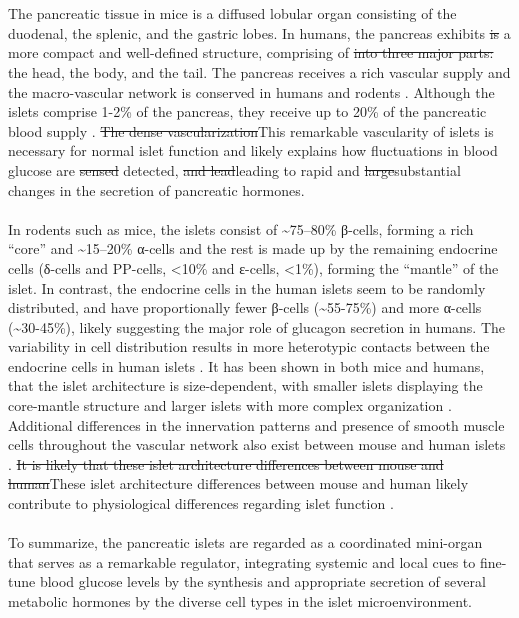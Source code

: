 \\\\
The pancreatic tissue in mice is a diffused lobular organ consisting of the duodenal, the splenic, and the gastric lobes. In humans, the pancreas exhibits \st{is} a more compact and well-defined structure, comprising of \st{into three major parts:} the head, the body, and the tail. The pancreas receives a rich vascular supply and the macro-vascular network is conserved in humans and rodents \textbf{\cite{muratore_vascular_2021}}. Although the islets comprise 1-2\% of the pancreas, they receive up to 20\% of the pancreatic blood supply \textbf{\cite{muratore_vascular_2021,jansson_glucose-induced_1986}}. \st{The dense vascularization}This remarkable vascularity of islets is necessary for normal islet function and likely explains how fluctuations in blood glucose are \st{sensed} detected, \st{and lead}leading to rapid and \st{large}substantial changes in the secretion of pancreatic hormones.
\\\\
In rodents such as mice, the islets consist of \textasciitilde75–80\% β-cells, forming a rich “core” and \textasciitilde15–20\% α-cells and the rest is made up by the remaining endocrine cells (δ-cells and PP-cells, <10\% and ε-cells, <1\%), forming the “mantle” of the islet. In contrast, the endocrine cells in the human islets seem to be randomly distributed, and have proportionally fewer β-cells (\textasciitilde55-75\%) and more α-cells (\textasciitilde30-45\%), likely suggesting the major role of glucagon secretion in humans. The variability in cell distribution results in more heterotypic contacts between the endocrine cells in human islets \textbf{\cite{walker_human_2021}}. It has been shown in both mice and humans, that the islet architecture is size-dependent, with smaller islets displaying the core-mantle structure and larger islets with more complex organization \textbf{\cite{dolensek_structural_2015}}. Additional differences in the innervation patterns and presence of smooth muscle cells throughout the vascular network also exist between mouse and human islets \textbf{\cite{rodriguez-diaz_autonomic_2011}}. \st{It is likely that these islet architecture differences between mouse and human}These islet architecture differences between mouse and human likely contribute to physiological differences regarding islet function \textbf{\cite{cabrera_unique_2006}}.
\\\\
To summarize, the pancreatic islets are regarded as a coordinated mini-organ that serves as a remarkable regulator, integrating systemic and local cues to fine-tune blood glucose levels by the synthesis and appropriate secretion of several metabolic hormones by the diverse cell types in the islet microenvironment.

